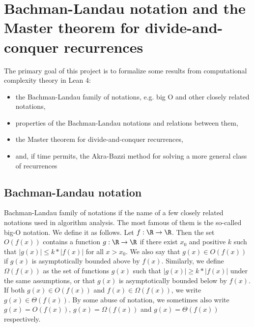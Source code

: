 %

\chapter{Bachman-Landau notation and the Master theorem for divide-and-conquer recurrences}

The primary goal of this project is to formalize some results from computational complexity theory in Lean 4:
\begin{itemize}
\item the Bachman-Landau family of notations, e.g. big O and other closely related notations,
\item properties of the Bachman-Landau notations and relations between them,
\item the Master theorem for divide-and-conquer recurrences,
\item and, if time permits, the Akra-Bazzi method for solving a more general class of recurrences
\end{itemize}

\section{Bachman-Landau notation}

Bachman-Landau family of notations if the name of a few closely related notations used in algorithm analysis. 
The most famous of them is the so-called big-O notation. We define it as follows. Let $f: \R \to \R$.
Then the set $O(f(x))$ contains a function $g: \R \to \R$ if there exist $x_0$ and positive $k$ such that
$|g(x)| \le k*|f(x)|$ for all $x \gt x_0$. We also say that $g(x) \in O(f(x))$ if $g(x)$
is asymptotically bounded above by $f(x)$. Similarly, we define $\Omega(f(x))$ as the set of 
functions $g(x)$ such that $|g(x)| \ge k*|f(x)|$ under the same assumptions, or that $g(x)$ is 
asymptotically bounded below by $f(x)$. If both $g(x) \in O(f(x))$ and $f(x) \in \Omega(f(x))$,
we write $g(x) \in \Theta(f(x))$. By some abuse of notation, we sometimes also write 
$g(x) = O(f(x))$, $g(x) = \Omega(f(x))$ and $g(x) = \Theta(f(x))$ respectively.

